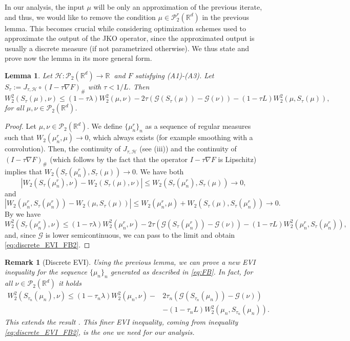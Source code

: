 \documentclass[11pt]{article}
\newtheorem{lemma}[theorem]{Lemma}
\newtheorem{remark}[theorem]{Remark}
\newcommand{\cP}{\mathcal{P}}
\newcommand{\cG}{\mathcal{G}}
\newcommand{\cT}{S}
\newcommand{\calH}{\mathcal{H}}
\newcommand{\R}{\mathbb{R}}
\numberwithin{equation}{section}
\begin{document}
In our analysis, the input $\mu$ will be only an approximation of the previous iterate, and thus, we would like to remove the condition $\mu \in \cP_2^r(\R^d)$ in the previous lemma. This becomes crucial while considering optimization schemes used to approximate the output of the JKO operator, since the approximated output is usually a discrete measure (if not parametrized otherwise). We thus state and prove now the lemma in its more general form.

\begin{lemma}\label{lem:discreteEVI2}
	Let $\mathcal{H} : \cP_2(\R^d) \to \mathbb{R} \ $ and $F$ satisfying (A1)-(A3). Let $\cT_{\tau}:=J_{\tau , \calH}\circ (I-\tau \nabla F)_{\#}$ with $\tau < 1/L$. Then
	\begin{equation}\label{eq:discrete_EVI_FB2}
		W_2^2(\cT_\tau(\mu), \nu)\leq (1-\tau \lambda)W_2^2(\mu,\nu)-2\tau (\cG(\cT_\tau(\mu))-\cG(\nu))-(1-\tau L)W_2^2(\mu,\cT_\tau(\mu)),
	\end{equation}
	for all $\mu,\nu \in \cP_2(\R^d)$.
\end{lemma}
\begin{proof}
	Let $\mu,\nu\in \cP_2(\R^d)$. We define $\{\mu_n^r\}_n$ as a sequence of regular measures such that $W_2(\mu_n^r,\mu)\to 0$, which always exists (for example smoothing with a convolution). Then, the continuity of $J_{\tau,\mathcal{H}}$ (see  (iii)) and the continuity of $(I-\tau \nabla F)_\#$ (which follows by the fact that the operator $I-\tau \nabla F$ is Lipschitz) implies that $W_2(\cT_{\tau}(\mu_n^r),\cT_{\tau}(\mu))\to 0$. We have both
	\[|W_2(\cT_\tau(\mu_n^r),\nu)-W_2(\cT_\tau(\mu),\nu)|\leq W_2(\cT_\tau(\mu_n^r),\cT_\tau(\mu))\to 0,\] and \[|W_2(\mu_n^r,\cT_\tau(\mu_n^r))-W_2(\mu,\cT_\tau(\mu))|\leq W_2(\mu_n^r,\mu)+W_2(\cT_\tau(\mu),\cT_\tau(\mu_n^r))\to 0.\]
	By  we have
	\begin{equation*}
		W_2^2(\cT_\tau(\mu_n^r), \nu)\leq (1-\tau \lambda)W_2^2(\mu_n^r,\nu)-2\tau (\cG(\cT_\tau(\mu_n^r))-\cG(\nu))-(1-\tau L)W_2^2(\mu_n^r,\cT_\tau(\mu_n^r)),
	\end{equation*}
	and, since $\cG$ is lower semicontinuous, we can pass to the limit and obtain \eqref{eq:discrete_EVI_FB2}.
\end{proof}


\begin{remark}[Discrete EVI]\label{rem:discreteEVI}
	Using the previous lemma, we can prove a new EVI inequality for the sequence $\{\mu_n\}_n$ generated as described in \eqref{eq:FB}. In fact, for all $\nu \in \cP_2(\R^d)$ it holds
	\begin{equation}\label{eq:discrete_EVI_FB_true}
		\begin{aligned}
			W_2^2(\cT_{\tau_n}(\mu_{n}), \nu)\leq (1-\tau_n \lambda)W_2^2(\mu_n,\nu)-& 2\tau_n (\cG(\cT_{\tau_n}(\mu_{n}))-\cG(\nu))\\
			&-(1-\tau_n L)W_2^2(\mu_n,\cT_{\tau_n}(\mu_{n})).
		\end{aligned}
	\end{equation}
	This extends the result \cite[Proposition 8]{WPG2020}. This finer EVI inequality, coming from inequality \eqref{eq:discrete_EVI_FB2}, is the one we need for our analysis.
\end{remark}
\end{document}
